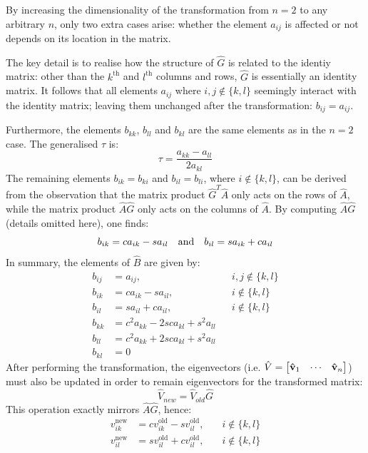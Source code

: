 \documentclass[reprint,english]{revtex4-1}
\begin{document}
By increasing the dimensionality of the transformation from \(n=2\) to any arbitrary \(n\), only two extra cases arise: whether the element \(a_{ij}\) is affected or not depends on its location in the matrix.

The key detail is to realise how the structure of \(\hat{G}\) is related to the identiy matrix: other than the \(k^{\text{th}}\) and \(l^{\text{th}}\) columns and rows, \(\hat{G}\) is essentially an identity matrix. It follows that all elements \(a_{ij}\) where \(i,j\notin\{k,l\}\) seemingly interact with the identity matrix; leaving them unchanged after the transformation: \(b_{ij}=a_{ij}\).

Furthermore, the elements \(b_{kk}\), \(b_{ll}\) and \(b_{kl}\) are the same elements as in the \(n=2\) case. The generalised \(\tau\) is:
\begin{equation}\label{eq:jacobi_algorithm_tau}
\tau=\frac{a_{kk}-a_{ll}}{2a_{kl}}
\end{equation}
The remaining elements \(b_{ik}=b_{ki}\) and \(b_{il}=b_{li}\), where \(i\notin\{k,l\}\), can be derived from the observation that the matrix product \(\hat{G}^T\hat{A}\) only acts on the rows of \(\hat{A}\), while the matrix product \(\hat{A}\hat{G}\) only acts on the columns of \(\hat{A}\). By computing \(\hat{A}\hat{G}\) (details omitted here), one finds:
\[b_{ik}=ca_{ik}-sa_{il}\qand b_{il}=sa_{ik}+ca_{il}\]
In summary, the elements of \(\hat{B}\) are given by:
\begin{subequations}\label{eq:Givens_transformation_matrix}
\begin{alignat}{3}
b_{ij}&=a_{ij},&&i,j\notin\{k,l\}\\
b_{ik}&=ca_{ik}-sa_{il},&&i\notin\{k,l\}\\
b_{il}&=sa_{il}+ca_{il},&&i\notin\{k,l\}\\
b_{kk}&=c^2a_{kk}-2sca_{kl}+s^2a_{ll}&&\\
b_{ll}&=c^2a_{kk}+2sca_{kl}+s^2a_{ll}&&\\
b_{kl}&=0&&
\end{alignat}
\end{subequations}
After performing the transformation, the eigenvectors (i.e. \(\hat{V}=\mqty[\vu{v}_1&\cdots&\vu{v}_n]\)) must also be updated in order to remain eigenvectors for the transformed matrix:
\begin{equation}
\hat{V}_{new}=\hat{V}_{old}\hat{G}
\end{equation}
This operation exactly mirrors \(\hat{A}\hat{G}\), hence:
\begin{subequations}\label{eq:Givens_transformation_eigenvectors}
\begin{alignat}{2}
v_{ik}^{\text{new}}&=cv_{ik}^{\text{old}}-sv_{il}^{\text{old}},&\quad i\notin\{k,l\}\\
v_{il}^{\text{new}}&=sv_{il}^{\text{old}}+cv_{il}^{\text{old}},&\quad i\notin\{k,l\}
\end{alignat}
\end{subequations}
\end{document}

